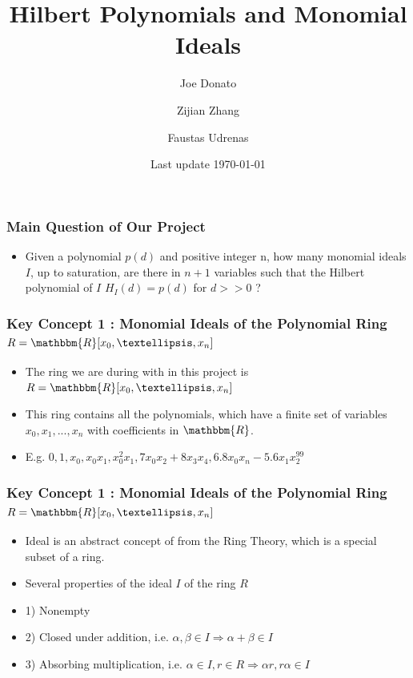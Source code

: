 \documentclass{beamer}
\title[University of Michigan LoG(M)]{Hilbert Polynomials and Monomial Ideals}
\author{Joe Donato \and Zijian Zhang \and Faustas Udrenas }
\institute{University of Michigan}
\date{Last update \today}
\begin{document}
\begin{frame}
\titlepage
\end{frame}


\begin{frame}
\frametitle{Main Question of Our Project}
\begin{itemize}
	\item Given a polynomial \(p(d)\) and positive integer n, how many monomial ideals \(I\), up to saturation, are there in \(n + 1\) variables such that the Hilbert polynomial of \(I\) \(H_{I}(d) = p(d)\) for \(d >> 0\) ?
\end{itemize}
\end{frame}

\begin{frame}
\frametitle{Key Concept 1 : Monomial Ideals of the Polynomial Ring \(R = \mathbbm{R}[x_0, …, x_n]\)}
\begin{itemize}
	\item The ring we are during with in this project is \(R = \mathbbm{R}[x_0, …, x_n]\)
	\item This ring contains all the polynomials, which have a finite set of variables \(x_0, x_1, ... , x_n\) with coefficients in \(\mathbbm{R}\).
	\item E.g. \(0, 1, x_0, x_0x_1, x_0^{2}x_1, 7x_0x_2 + 8x_3x_4, 6.8x_0x_n - 5.6x_1x_2^{99} \)
\end{itemize}
\end{frame}

\begin{frame}
\frametitle{Key Concept 1 : Monomial Ideals of the Polynomial Ring \(R = \mathbbm{R}[x_0, …, x_n]\)}
\begin{itemize}
	\item Ideal is an abstract concept of from the Ring Theory, which is a special subset of a ring.
	\item Several properties of the ideal \(I\) of the ring \(R\)
	\item 1) Nonempty
	\item 2) Closed under addition, i.e. \(\alpha, \beta \in I \Rightarrow \alpha + \beta \in I\)
	\item 3) Absorbing multiplication, i.e. \(\alpha \in I, r \in R \Rightarrow \alpha r, r \alpha \in I\)
\end{itemize}
\end{frame}

\end{document}
